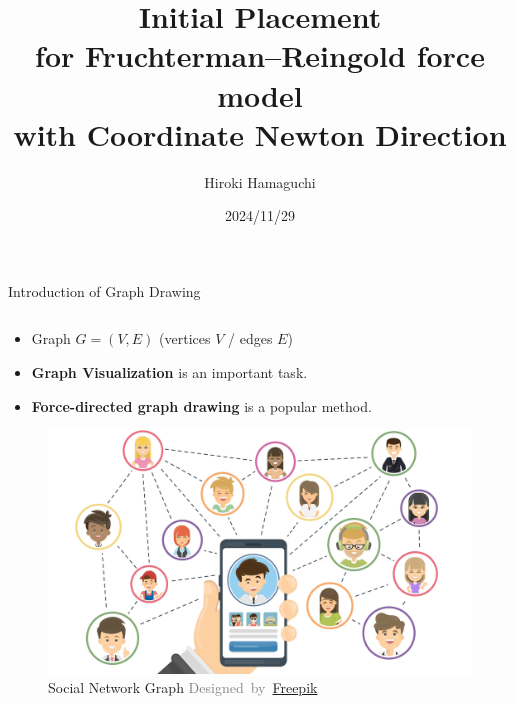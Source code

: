 \documentclass[dvipdfmx,13pt,aspectratio=169]{beamer}
\title{\huge{Initial Placement\\for Fruchterman--Reingold force model\\with Coordinate Newton Direction}}
\author{\Large{Hiroki Hamaguchi}}
\institute{\large{5th lab}\\\large{Supervisors: Prof. Akiko Takeda}}
\date{2024/11/29}
\newcommand{\gray}[1]{\textcolor{gray}{#1}}
\newif\ifShowHidden
\begin{document}
\ifShowHidden
  \maketitle
\fi

\ifShowHidden
  \begin{frame}{Introduction of Graph Drawing}
    \begin{columns}
      \begin{column}{0.58\columnwidth}
        \begin{itemize}
          \item Graph $G = (V,E)$ (vertices $V$  / edges $E$)
          \item \textbf{Graph Visualization} \small{is an important task.}
          \item \textbf{Force-directed graph drawing} \small{is a popular method.}
        \end{itemize}
        \begin{figure}[htbp]
          \centering
          \begin{minipage}{0.55\columnwidth}
            \centering
            \includegraphics[width=\columnwidth]{introExample/social.jpg}
            \caption*{
              Social Network Graph
              \gray{\footnotesize{Designed~by~\href{www.freepik.com}{Freepik}}}
            }
          \end{minipage}%
          \begin{minipage}{0.45\columnwidth}
            \centering

\end{minipage}
\end{figure}
\end{column}
\end{columns}
\end{frame}
\end{document}
